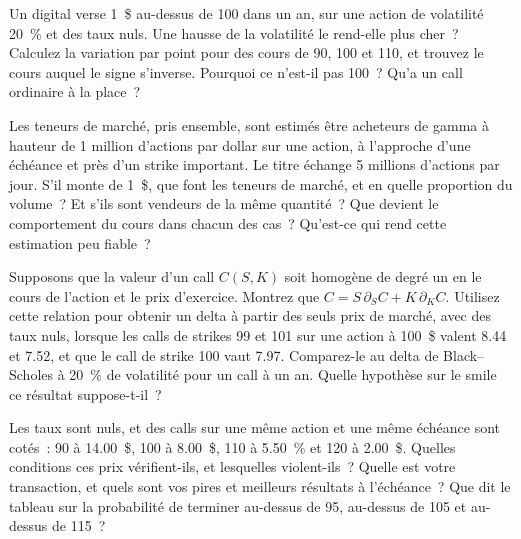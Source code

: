 \begin{question}\label{iq:iv2:options-parity-and-greeks:44}
Un digital verse 1~\$ au-dessus de 100 dans un an, sur une action de volatilité 20~\% et des taux nuls. Une hausse de la volatilité le rend-elle plus cher~? Calculez la variation par point pour des cours de 90, 100 et 110, et trouvez le cours auquel le signe s'inverse. Pourquoi ce n'est-il pas 100~? Qu'a un call ordinaire à la place~?
\end{question}

\begin{question}\label{iq:iv2:options-parity-and-greeks:45}
Les teneurs de marché, pris ensemble, sont estimés être acheteurs de gamma à hauteur de 1 million d'actions par dollar sur une action, à l'approche d'une échéance et près d'un strike important. Le titre échange 5 millions d'actions par jour. S'il monte de 1~\$, que font les teneurs de marché, et en quelle proportion du volume~? Et s'ils sont vendeurs de la même quantité~? Que devient le comportement du cours dans chacun des cas~? Qu'est-ce qui rend cette estimation peu fiable~?
\end{question}

\begin{question}\label{iq:iv2:options-parity-and-greeks:46}
Supposons que la valeur d'un call $C(S, K)$ soit homogène de degré un en le cours de l'action et le prix d'exercice. Montrez que $C = S\,\partial_S C + K\,\partial_K C$. Utilisez cette relation pour obtenir un delta à partir des seuls prix de marché, avec des taux nuls, lorsque les calls de strikes 99 et 101 sur une action à 100~\$ valent 8.44 et 7.52, et que le call de strike 100 vaut 7.97. Comparez-le au delta de Black--Scholes à 20~\% de volatilité pour un call à un an. Quelle hypothèse sur le smile ce résultat suppose-t-il~?
\end{question}

\begin{question}\label{iq:iv2:options-parity-and-greeks:47}
Les taux sont nuls, et des calls sur une même action et une même échéance sont cotés~: 90 à 14.00~\$, 100 à 8.00~\$, 110 à 5.50~\% et 120 à 2.00~\$. Quelles conditions ces prix vérifient-ils, et lesquelles violent-ils~? Quelle est votre transaction, et quels sont vos pires et meilleurs résultats à l'échéance~? Que dit le tableau sur la probabilité de terminer au-dessus de 95, au-dessus de 105 et au-dessus de 115~?
\end{question}

